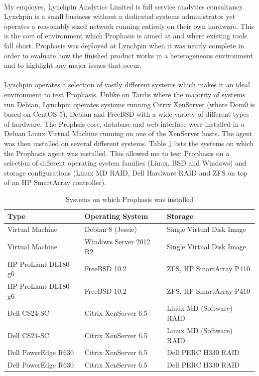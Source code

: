 \documentclass[bsc,logo,twoside,singlespacing,notimes]{infthesis}
\begin{document}
\paragraph*{}
	My employer, Lynchpin Analytics Limited is full service analytics consultancy.
	Lynchpin is a small business without a dedicated systems administrator yet
	operates a reasonably sized network running entirely on their own hardware.
	This is the sort of environment which Prophasis is aimed at and where existing
	tools fall short.  Prophasis was deployed at Lynchpin when it was nearly
	complete in order to evaluate how the finished product works in a heterogeneous
	environment and to highlight any major issues that occur.

\paragraph*{}
	Lynchpin operates a selection of vastly different systems which makes it an
	ideal environment to test Prophasis.  Unlike on Tardis where the majority of
	systems run Debian, Lynchpin operates systems running Citrix XenServer (where
	Dom0 is based on CentOS 5), Debian and FreeBSD with a wide variety of different
	types of hardware.  The Prophsis core, database and web interface were
	installed in a Debian Linux Virtual Machine running on one of the XenServer
	hosts.  The agent was then installed on several different systems.  Table
	\ref{table-lypn-hosts} lists the systems on which the Prophasis agent was
	installed.  This allowed me to test Prophasis on a selection of different
	operating system families (Linux, BSD and Windows) and storage configurations
	(Linux MD RAID, Dell Hardware RAID and ZFS on top of an HP SmartArray
	controller).
	
\begin{table}[H]
	\centering
	\caption{Systems on which Prophasis was installed}
	\label{table-lypn-hosts}
    \begin{tabular}{|l|l|l|}
    \hline
    \textbf{Type} & \textbf{Operating System} & \textbf{Storage} \\ \hline
    Virtual Machine & Debian 8 (Jessie) & Single Virtual Disk Image \\
    Virtual Machine & Windows Server 2012 R2 & Single Virtual Disk Image \\
    HP ProLiant DL180 g6 & FreeBSD 10.2 & ZFS, HP SmartArray P410 \\
    HP ProLiant DL180 g6 & FreeBSD 10.2 & ZFS, HP SmartArray P410 \\
    Dell CS24-SC & Citrix XenServer 6.5 & Linux MD (Software) RAID \\
    Dell CS24-SC & Citrix XenServer 6.5 & Linux MD (Software) RAID \\
    Dell PowerEdge R630 & Citrix XenServer 6.5 & Dell PERC H330 RAID \\
    Dell PowerEdge R630 & Citrix XenServer 6.5 & Dell PERC H330 RAID \\ \hline
    \end{tabular}
\end{table}
\end{document}
